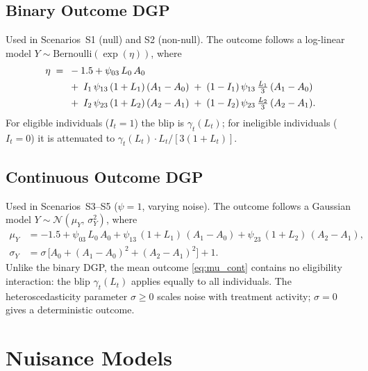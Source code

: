 \documentclass[12pt]{article}
\begin{document}
\subsection{Binary Outcome DGP}

Used in Scenarios~S1 (null) and S2 (non-null).  The outcome follows a
log-linear model $Y\sim\mathrm{Bernoulli}(\exp(\eta))$, where
\begin{align}
  \eta \;=\; {}&-1.5
  + \psi_{03}\,L_0\,A_0 \notag\\
  &+\; I_1\,\psi_{13}\,(1+L_1)\,(A_1-A_0)
   \;+\; (1-I_1)\,\psi_{13}\,\tfrac{L_1}{3}\,(A_1-A_0) \notag\\
  &+\; I_2\,\psi_{23}\,(1+L_2)\,(A_2-A_1)
   \;+\; (1-I_2)\,\psi_{23}\,\tfrac{L_2}{3}\,(A_2-A_1).\label{eq:eta}
\end{align}
For eligible individuals ($I_t=1$) the blip is $\gamma_t(L_t)$;
for ineligible individuals ($I_t=0$) it is attenuated to
$\gamma_t(L_t)\cdot L_t/[3(1+L_t)]$.

\subsection{Continuous Outcome DGP}

Used in Scenarios~S3--S5 ($\psi=1$, varying noise).
The outcome follows a Gaussian model
$Y\sim\mathcal{N}(\mu_Y,\,\sigma_Y^2)$, where
\begin{align}
  \mu_Y &= -1.5
    + \psi_{03}\,L_0\,A_0
    + \psi_{13}\,(1+L_1)\,(A_1-A_0)
    + \psi_{23}\,(1+L_2)\,(A_2-A_1),\label{eq:mu_cont}\\
  \sigma_Y &= \sigma\,\bigl[A_0+(A_1-A_0)^2+(A_2-A_1)^2\bigr]+1.\label{eq:sigma_cont}
\end{align}
Unlike the binary DGP, the mean outcome \eqref{eq:mu_cont} contains no
eligibility interaction: the blip $\gamma_t(L_t)$ applies equally to
all individuals.  The heteroscedasticity parameter $\sigma\geq0$
scales noise with treatment activity; $\sigma=0$ gives a deterministic outcome.

\section{Nuisance Models}
\end{document}
